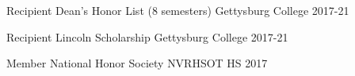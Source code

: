 \begin{cvhonors}

\cvhonor
{Recipient} %
{Dean's Honor List (8 semesters)} %
{Gettysburg College} %
{2017-21} %


\cvhonor
{Recipient} %
{Lincoln Scholarship} %
{Gettysburg College} %
{2017-21} %


\cvhonor
{Member} %
{National Honor Society} %
{NVRHSOT HS} %
{2017} %


\end{cvhonors}

